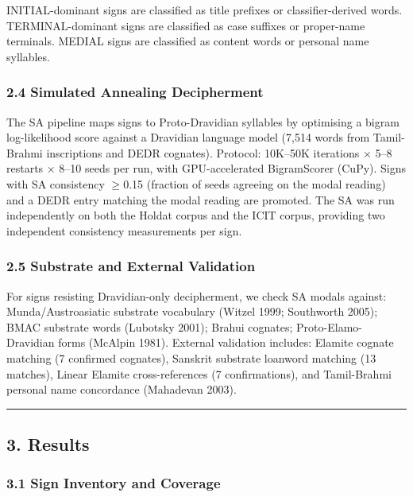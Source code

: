 \documentclass[
  11pt,
]{article}
\begin{document}
INITIAL-dominant signs are classified as title prefixes or
classifier-derived words. TERMINAL-dominant signs are classified as case
suffixes or proper-name terminals. MEDIAL signs are classified as
content words or personal name syllables.

\subsubsection{2.4 Simulated Annealing
Decipherment}\label{simulated-annealing-decipherment}

The SA pipeline maps signs to Proto-Dravidian syllables by optimising a
bigram log-likelihood score against a Dravidian language model (7,514
words from Tamil-Brahmi inscriptions and DEDR cognates). Protocol:
10K--50K iterations × 5--8 restarts × 8--10 seeds per run, with
GPU-accelerated BigramScorer (CuPy). Signs with SA consistency $\geq$0.15
(fraction of seeds agreeing on the modal reading) and a DEDR entry
matching the modal reading are promoted. The SA was run independently on
both the Holdat corpus and the ICIT corpus, providing two
independent consistency measurements per sign.

\subsubsection{2.5 Substrate and External
Validation}\label{substrate-and-external-validation}

For signs resisting Dravidian-only decipherment, we check SA modals
against: Munda/Austroasiatic substrate vocabulary (Witzel 1999;
Southworth 2005); BMAC substrate words (Lubotsky 2001); Brahui cognates;
Proto-Elamo-Dravidian forms (McAlpin 1981). External validation
includes: Elamite cognate matching (7 confirmed cognates), Sanskrit
substrate loanword matching (13 matches), Linear Elamite
cross-references (7 confirmations), and Tamil-Brahmi personal name
concordance (Mahadevan 2003).

\begin{center}\rule{0.5\linewidth}{0.5pt}\end{center}

\subsection{3. Results}\label{results}

\subsubsection{3.1 Sign Inventory and
Coverage}\label{sign-inventory-and-coverage}
\end{document}
